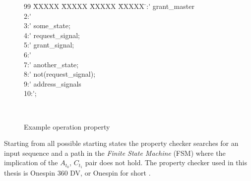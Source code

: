 \begin{figure}[h]
	\centering	
	\begin{minipage}[b]{0.9\linewidth}
	\sffamily\footnotesize
		\begin{tabbing}
			99 \= XXXXX \= XXXXX \= XXXXX \= XXXXX \= :\'  grant\_master  \\
			2:\' \\
			3:\'\> \ITLRW{:} some\_state; \\
			4:\'\> \ITLRW{:} request\_signal; \\
			5:\'\> \ITLRW{+}\ITLRW{:} grant\_signal; \\
			6:\'  \\ 
			7:\'\> \ITLRW{+}\ITLRW{:} another\_state; \\
			8:\'\> \ITLRW{+}\ITLRW{:} not(request\_signal); \\
                        9:\'\> \ITLRW{+}\ITLRW{:} address\_signals \\
			10:\' ; \\
		\end{tabbing}  
	\end{minipage}\\
	\sffamily\footnotesize
	\caption{Example operation property}
	\label{fig:exop}
\end{figure}

Starting from all possible starting states the property checker searches for an input sequence and a path in the \textit{Finite State Machine} (FSM) where the implication of the $A_{t_0}$, $C_{t_1}$ pair does not hold. The property checker used in this thesis is Onespin 360 DV, or Onespin for short \cite{onespin}. 

